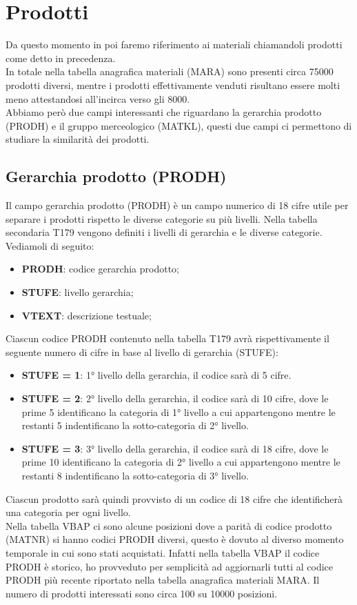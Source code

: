 \section{Prodotti}
Da questo momento in poi faremo riferimento ai materiali chiamandoli prodotti come detto in precedenza.\\
In totale nella tabella anagrafica materiali (MARA) sono presenti circa 75000 prodotti diversi, mentre i prodotti effettivamente venduti risultano essere molti meno attestandosi all'incirca verso gli 8000.\\
Abbiamo però due campi interessanti che riguardano la gerarchia prodotto (PRODH) e il gruppo merceologico (MATKL), questi due campi ci permettono di studiare la similarità dei prodotti.

\subsection{Gerarchia prodotto (PRODH)}
Il campo gerarchia prodotto (PRODH) è un campo numerico di 18 cifre utile per separare i prodotti rispetto le diverse categorie su più livelli.
Nella tabella secondaria T179 vengono definiti i livelli di gerarchia e le diverse categorie. 
Vediamoli di seguito:
\begin{itemize}
	\item \textbf{PRODH}: codice gerarchia prodotto;
	\item \textbf{STUFE}: livello gerarchia;
	\item \textbf{VTEXT}: descrizione testuale;
\end{itemize} 

Ciascun codice PRODH contenuto nella tabella T179 avrà rispettivamente il seguente numero di cifre in base al livello di gerarchia (STUFE):
\begin{itemize}
	\item \textbf{STUFE = 1}: 1° livello della gerarchia, il codice sarà di 5 cifre.
	\item \textbf{STUFE = 2}: 2° livello della gerarchia, il codice sarà di 10 cifre, dove le prime 5 identificano la categoria di 1° livello a cui appartengono mentre le restanti 5 indentificano la sotto-categoria di 2° livello.
	\item \textbf{STUFE = 3}: 3° livello della gerarchia, il codice sarà di 18 cifre, dove le prime 10 identificano la categoria di 2° livello a cui appartengono mentre le restanti 8 indentificano la sotto-categoria di 3° livello.
\end{itemize}
Ciascun prodotto sarà quindi provvisto di un codice di 18 cifre che identificherà una categoria per ogni livello.\\
Nella tabella VBAP ci sono alcune posizioni dove a parità di codice prodotto (MATNR) si hanno codici PRODH diversi, questo è dovuto al diverso momento temporale in cui sono stati acquistati. Infatti nella tabella VBAP il codice PRODH è storico, ho provveduto per semplicità ad aggiornarli tutti al codice PRODH più recente riportato nella tabella anagrafica materiali MARA.
Il numero di prodotti interessati sono circa 100 su 10000 posizioni.\\
